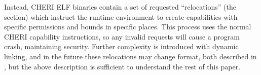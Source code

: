 Instead, CHERI ELF binaries contain a set of requested ``relocations'' (the  section) which instruct the runtime environment to create capabilities with specific permissions and bounds in specific places.
This process uses the normal CHERI capability instructions, so any invalid requests will cause a program crash, maintaining security.
Further complexity is introduced with dynamic linking, and in the future these relocations may change format, both described in , but the above description is sufficient to understand the rest of this paper.

